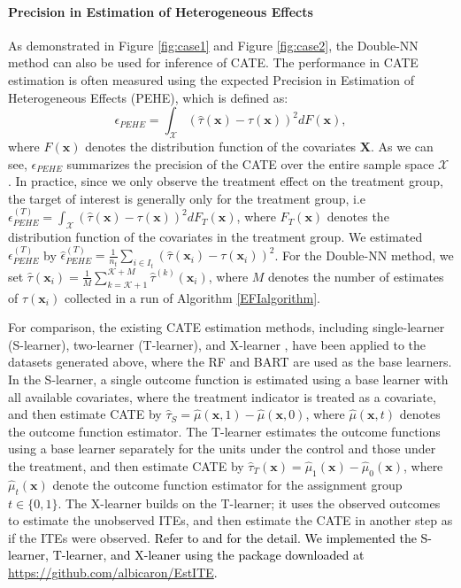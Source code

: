 \documentclass[11pt]{article}
\newcommand{\bX}{{\boldsymbol X}}
\newcommand{\bx}{{\boldsymbol x}}
\newcommand{\mK}{\mathcal{K}}
\newcommand{\mX}{\mathcal{X}}
\begin{document}
\paragraph{Precision in Estimation of Heterogeneous Effects}

As demonstrated in Figure \ref{fig:case1} and Figure \ref{fig:case2}, the Double-NN method
can also be used for inference of CATE. The performance in CATE estimation 
is often measured using the expected Precision 
in Estimation of Heterogeneous Effects (PEHE), which is defined as:
\[
\epsilon_{PEHE}=\int_{\mathcal{X}}(\hat{\tau}(\bx)-\tau(\bx))^2 dF(\bx),
\]
where $F(\bx)$ denotes the distribution function of the covariates $\bX$. 
As we can see, $\epsilon_{PEHE}$ summarizes the precision of the CATE over the entire 
sample space $\mX$ \citep{Hill2011bart,shalit2017pehe,caron2022itereview}.  
In practice, since we only observe the treatment effect on the treatment group, 
the target of interest is generally only for the treatment group, i.e  $\epsilon_{PEHE}^{(T)}=\int_{\mathcal{X}}(\hat{\tau}(\bx)- \tau(\bx))^2 dF_T(\bx)$, where $F_T(\bx)$ denotes the distribution function of the covariates in the treatment group. 
We estimated $\epsilon_{PEHE}^{(T)}$ by $\hat{\epsilon}_{PEHE}^{(T)}=\frac{1}{n_t}\sum_{i\in I_{t}}(\hat{\tau}(\bx_i)-\tau(\bx_i))^2$. 
For the Double-NN method, we set $\hat{\tau}(\bx_i)=\frac{1}{M}\sum_{k=\mK+1}^{\mK+M}\hat{\tau}^{(k)}(\bx_i)$, where $M$ denotes the number of estimates of $\tau(\bx_i)$ 
collected in a run of Algorithm \ref{EFIalgorithm}. 

For comparison, the existing CATE estimation methods, including single-learner (S-learner), 
two-learner (T-learner), and X-learner \citep{Knzel2019MetalearnersFE}, 
have been applied to the datasets generated above, where the RF and BART are used 
as the base learners. In the S-learner, a single outcome function is estimated using a base learner %
with all available covariates,
where the treatment indicator is treated as a covariate, and then estimate CATE by 
$\hat{\tau}_S=\hat{\mu}(\bx,1)-\hat{\mu}(\bx,0)$,
where $\hat{\mu}(\bx,t)$ denotes the outcome function estimator. 
The T-learner estimates the outcome functions using a base learner separately for the units under the control and those under the treatment, and then estimate CATE by 
$\hat{\tau}_T(\bx)=\hat{\mu}_1(\bx)-\hat{\mu}_0(\bx)$,
where $\hat{\mu}_t(\bx)$ denote the outcome function estimator for the assignment group 
$t \in \{0,1\}$. The X-learner builds on the T-learner; it uses the observed outcomes 
to estimate the unobserved ITEs, and then estimate the CATE in another step as if 
the ITEs were observed. \textcolor{black}{Refer to \cite{Knzel2019MetalearnersFE} and \cite{caron2022itereview} for the detail. 
We implemented the S-learner, T-learner, and X-leaner using the package downloaded at \url{https://github.com/albicaron/EstITE}.}  
\end{document}
